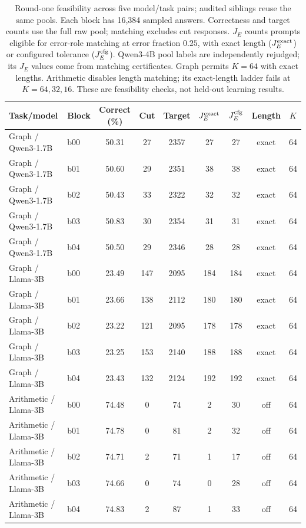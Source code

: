 \begin{table}[H]
\caption{Round-one feasibility across five model/task pairs; audited siblings reuse the same pools. Each block has 16,384 sampled answers. Correctness and target counts use the full raw pool; matching excludes cut responses. $J_E$ counts prompts eligible for error-role matching at error fraction $0.25$, with exact length ($J_E^{\rm exact}$) or configured tolerance ($J_E^{\rm cfg}$). Qwen3-4B pool labels are independently rejudged; its $J_E$ values come from matching certificates. Graph permits $K=64$ with exact lengths. Arithmetic disables length matching; its exact-length ladder fails at $K=64,32,16$. These are feasibility checks, not held-out learning results.}
\label{tab:h100-feasibility}
\centering\small\setlength{\tabcolsep}{4pt}
\begin{tabular}{@{}llccccccc@{}}
\toprule
Task/model & Block & Correct (\%) & Cut & Target & $J_E^{\rm exact}$ & $J_E^{\rm cfg}$ & Length & $K$\\
\midrule
Graph / Qwen3-1.7B & b00 & 50.31 & 27 & 2357 & 27 & 27 & exact & 64\\
Graph / Qwen3-1.7B & b01 & 50.60 & 29 & 2351 & 38 & 38 & exact & 64\\
Graph / Qwen3-1.7B & b02 & 50.43 & 33 & 2322 & 32 & 32 & exact & 64\\
Graph / Qwen3-1.7B & b03 & 50.83 & 30 & 2354 & 31 & 31 & exact & 64\\
Graph / Qwen3-1.7B & b04 & 50.50 & 29 & 2346 & 28 & 28 & exact & 64\\
Graph / Llama-3B & b00 & 23.49 & 147 & 2095 & 184 & 184 & exact & 64\\
Graph / Llama-3B & b01 & 23.66 & 138 & 2112 & 180 & 180 & exact & 64\\
Graph / Llama-3B & b02 & 23.22 & 121 & 2095 & 178 & 178 & exact & 64\\
Graph / Llama-3B & b03 & 23.25 & 153 & 2140 & 188 & 188 & exact & 64\\
Graph / Llama-3B & b04 & 23.43 & 132 & 2124 & 192 & 192 & exact & 64\\
Arithmetic / Llama-3B & b00 & 74.48 & 0 & 74 & 2 & 30 & off & 64\\
Arithmetic / Llama-3B & b01 & 74.78 & 0 & 81 & 2 & 32 & off & 64\\
Arithmetic / Llama-3B & b02 & 74.71 & 2 & 71 & 1 & 17 & off & 64\\
Arithmetic / Llama-3B & b03 & 74.66 & 0 & 74 & 0 & 28 & off & 64\\
Arithmetic / Llama-3B & b04 & 74.83 & 2 & 87 & 1 & 33 & off & 64\\

\end{tabular}
\end{table}
